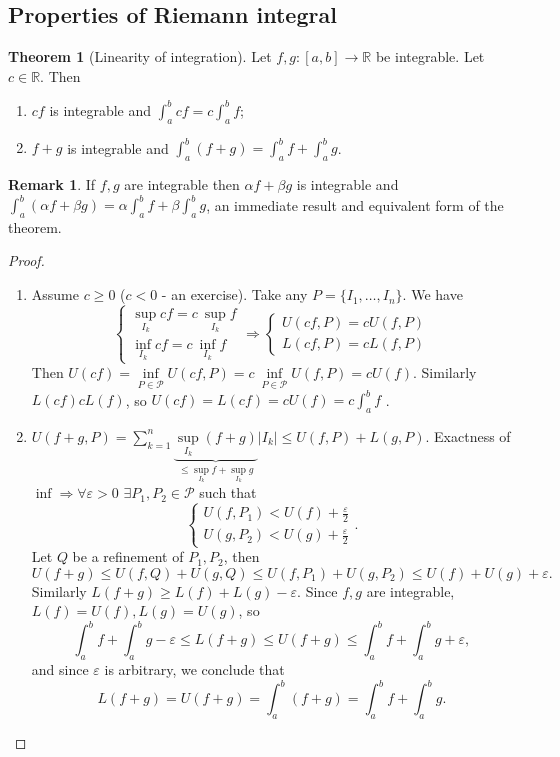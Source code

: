 \documentclass[a4paper]{article}
\theoremstyle{definition}
\newtheorem{thm}[defn]{Theorem}
\newtheorem*{remark}{Remark}
\begin{document}
\subsection{Properties of Riemann integral}

\begin{thm}[Linearity of integration]
	Let $f,g:[a,b]\rightarrow \mathbb R$ be integrable. Let $c\in \mathbb R$. Then \begin{enumerate}
		\item $cf$ is integrable and $\int_a^b cf = c\int_a^b f$;
		\item $f+g$ is integrable and $\int_a^b (f+g)=\int_a^b f+\int_a^b g$.
	\end{enumerate}
\end{thm}

\begin{remark}
	If $f,g$ are integrable then $\alpha f + \beta g$ is integrable and $\int_a^b (\alpha f+\beta g)=\alpha \int_a^b f+\beta \int_a^b g$, an immediate result and equivalent form of the theorem.
\end{remark}

\begin{proof}
	\begin{enumerate}
		\item Assume $c\geq 0$ ($c<0$ - an exercise). Take any $P=\{I_1,\ldots,I_n\}$. We have
\[
\left\{\begin{aligned}
			\underset{I_k}{\sup} cf = c \ \underset{I_k}{\sup} f \\ \underset{I_k}{\inf} cf = c \ \underset{I_k}{\inf} f
		\end{aligned} \right. \Rightarrow \left\{\begin{aligned}
			U(cf,P)=cU(f,P) \\ L(cf,P)=cL(f,P)
		\end{aligned} \right.
\]
Then $U(cf)=\underset{P\in\mathcal P}{\inf} U(cf,P)=c \ \underset{P\in \mathcal P}{\inf} U(f,P) = cU(f)$. Similarly $L(cf)cL(f)$, so $U(cf)=L(cf)=cU(f)=c\int_a^b f$ .
		\item $U(f+g,P) = \sum_{k=1}^n \underbrace{\underset{I_k}{\sup} (f+g)}_{\leq \underset{I_k}{\sup} f+\underset{I_k}{\sup} g} |I_k| \leq U(f,P)+L(g,P)$. Exactness of $\inf \Rightarrow \forall \varepsilon >0$ $\exists P_1,P_2 \in \mathcal P$ such that
\[
\left\{ \begin{aligned}
			U(f,P_1) < U(f)+\frac{\varepsilon}{2} \\ U(g,P_2) < U(g) + \frac{\varepsilon}{2}
		\end{aligned} \right. .
\]
Let $Q$ be a refinement of $P_1,P_2$, then
\[
U(f+g) \leq U(f,Q)+U(g,Q) \leq U(f,P_1)+U(g,P_2) \leq U(f)+U(g)+\varepsilon .
\]
Similarly $L(f+g) \geq L(f)+L(g)-\varepsilon$. Since $f,g$ are integrable, $L(f)=U(f),L(g)=U(g)$, so
\[
\int_a^b f + \int_a^b g - \varepsilon \leq L(f+g) \leq U(f+g) \leq \int_a^b f + \int_a^b g + \varepsilon ,
\]
and since $\varepsilon$ is arbitrary, we conclude that
\[
L(f+g)=U(f+g)=\int_a^b (f+g)=\int_a^b f+\int_a^b g .
\]
	\end{enumerate}
\end{proof}
\end{document}
